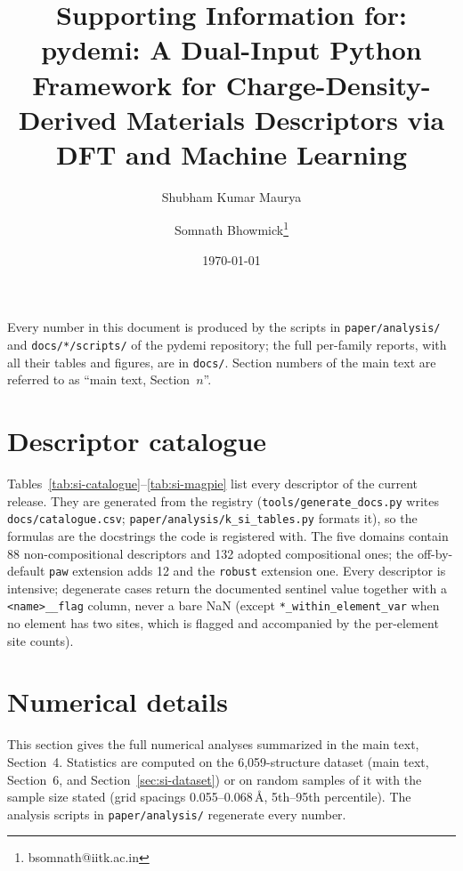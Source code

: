 \documentclass[11pt,a4paper]{article}
\title{\textbf{Supporting Information for: pydemi: A Dual-Input Python Framework for Charge-Density-Derived Materials Descriptors via DFT and Machine Learning}}
\author[1]{Shubham Kumar Maurya}
\author[1]{Somnath Bhowmick\thanks{bsomnath@iitk.ac.in}}
\affil[1]{Department of Materials Science \& Engineering, Indian Institute of Technology Kanpur, Kanpur 208016, India}
\date{\today}
\begin{document}
\maketitle

\noindent Every number in this document is produced by the scripts in
\texttt{paper/analysis/} and \texttt{docs/*/scripts/} of the pydemi repository;
the full per-family reports, with all their tables and figures, are in
\texttt{docs/}. Section numbers of the main text are referred to as
``main text, Section~$n$''.

\tableofcontents

\section{Descriptor catalogue}
\label{sec:si-catalogue}

Tables~\ref{tab:si-catalogue}--\ref{tab:si-magpie} list every descriptor of the
current release. They are generated from the registry
(\texttt{tools/generate\_docs.py} writes \texttt{docs/catalogue.csv};
\texttt{paper/analysis/k\_si\_tables.py} formats it), so the formulas are the
docstrings the code is registered with. The five domains contain 88
non-compositional descriptors and 132 adopted compositional ones; the
off-by-default \texttt{paw} extension adds 12 and the \texttt{robust}
extension one. Every descriptor is intensive; degenerate cases return the
documented sentinel value together with a \texttt{<name>\_\_flag} column,
never a bare NaN (except \texttt{*\_within\_element\_var} when no element has
two sites, which is flagged and accompanied by the per-element site counts).



\section{Numerical details}
\label{sec:si-numerics}

This section gives the full numerical analyses summarized in the main text,
Section~4. Statistics are computed on the 6,059-structure dataset (main text,
Section~6, and Section~\ref{sec:si-dataset}) or on random samples of it with the
sample size stated (grid spacings 0.055--0.068\,\AA, 5th--95th percentile).
The analysis scripts in \texttt{paper/analysis/} regenerate every number.
\end{document}
